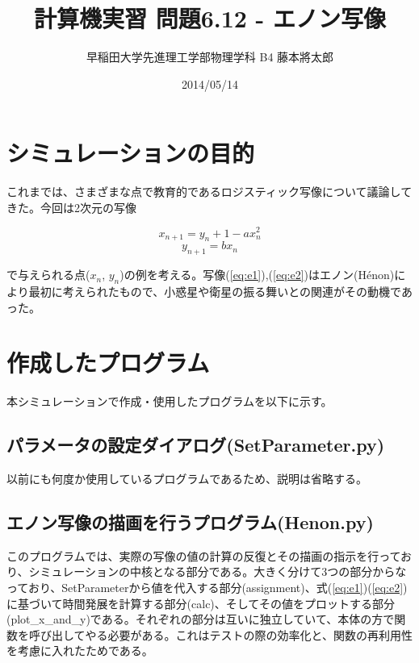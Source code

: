 \documentclass{jsarticle}
\title{計算機実習 問題6.12 - エノン写像}
\author{早稲田大学先進理工学部物理学科 B4 藤本將太郎}
\date{2014/05/14}
\begin{document}
\maketitle
    
    \section{シミュレーションの目的}
        
        これまでは、さまざまな点で教育的であるロジスティック写像について議論してきた。今回は2次元の写像
        
        \begin{equation}
            x_{n+1} = y_{n} + 1 - ax_{n}^{2}
            \label{eq:e1}
        \end{equation}
        \begin{equation}
            y_{n+1} = bx_{n}
            \label{eq:e2}
        \end{equation}

        
        で与えられる点($x_{n}$, $y_{n}$)の例を考える。写像(\ref{eq:e1}),(\ref{eq:e2})はエノン(H\'{e}non)により最初に考えられたもので、小惑星や衛星の振る舞いとの関連がその動機であった。
    \section{作成したプログラム}
        本シミュレーションで作成・使用したプログラムを以下に示す。
    
    
        \subsection{パラメータの設定ダイアログ(SetParameter.py)}
            以前にも何度か使用しているプログラムであるため、説明は省略する。
        \subsection{エノン写像の描画を行うプログラム(Henon.py)}
            このプログラムでは、実際の写像の値の計算の反復とその描画の指示を行っており、シミュレーションの中核となる部分である。大きく分けて3つの部分からなっており、SetParameterから値を代入する部分(assignment)、式(\ref{eq:e1})(\ref{eq:e2})に基づいて時間発展を計算する部分(calc)、そしてその値をプロットする部分(plot\_x\_and\_y)である。それぞれの部分は互いに独立していて、本体の方で関数を呼び出してやる必要がある。これはテストの際の効率化と、関数の再利用性を考慮に入れたためである。
        
\end{document}
